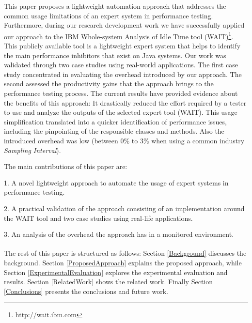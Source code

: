 \documentclass[runningheads,a4paper]{llncs}
\begin{document}
This paper proposes a lightweight automation approach that addresses the common
usage limitations of an expert system in performance testing. Furthermore,
during our research development work we have successfully applied our approach to 
the IBM Whole-system Analysis of Idle Time tool
(WAIT)\footnote{http://wait.ibm.com}. This publicly available tool is a
lightweight expert system that helps to identify the main performance inhibitors
that exist on Java systems. Our work was validated through two case studies 
using real-world applications. The first case study concentrated in
evaluating the overhead introduced by our approach. The second
assessed the productivity gains that the approach brings to the
performance testing process. The current results have provided evidence about
the benefits of this approach: It drastically reduced the effort required by a
tester to use and analyze the outputs of the selected expert tool (WAIT). This
usage simplification translated into a quicker identification of performance issues, including the pinpointing of the
responsible classes and methods. Also the introduced overhead was low
(between 0\% to 3\% when using a common industry \emph{Sampling Interval}).

The main contributions of this paper are: 

1. A novel lightweight approach to automate the usage of expert systems in
performance testing.

2. A practical validation of the approach consisting of an implementation
around the WAIT tool and two case studies using real-life applications.

3. An analysis of the overhead the approach has in a monitored environment.
\\\\
The rest of this paper is structured as follows: Section \ref{Background}
discusses the background. Section \ref{ProposedApproach} explains the proposed approach, while Section
\ref{ExperimentalEvaluation} explores the experimental evaluation and results.
Section \ref{RelatedWork} shows the related work. Finally Section
\ref{Conclusions} presents the conclusions and future work.


\vspace{-5pt}
\end{document}

